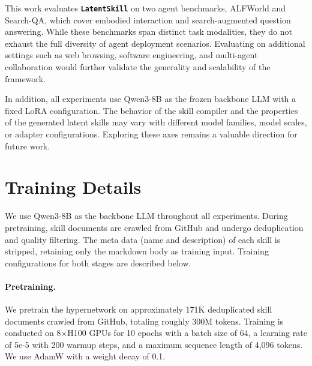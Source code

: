 \documentclass{llmxive}
\providecommand{\textttt}[1]{\texttt{#1}}
\providecommand{\method}{\textbf{\textttt{LatentSkill}}}
\begin{document}

This work evaluates \method{} on two agent benchmarks, ALFWorld and Search-QA, which cover embodied interaction and search-augmented question answering. While these benchmarks span distinct task modalities, they do not exhaust the full diversity of agent deployment scenarios. Evaluating on additional settings such as web browsing, software engineering, and multi-agent collaboration would further validate the generality and scalability of the framework.

In addition, all experiments use Qwen3-8B as the frozen backbone LLM with a fixed LoRA configuration. The behavior of the skill compiler and the properties of the generated latent skills may vary with different model families, model scales, or adapter configurations. Exploring these axes remains a valuable direction for future work.





\appendix
\section{Training Details}
\label{app:training}

We use Qwen3-8B \citep{Yang2025Qwen3} as the backbone LLM throughout all experiments. During pretraining, skill documents are crawled from GitHub and undergo deduplication and quality filtering. The meta data (name and description) of each skill is stripped, retaining only the markdown body as training input. Training configurations for both stages are described below.


\paragraph{Pretraining.} We pretrain the hypernetwork on approximately 171K deduplicated skill documents crawled from GitHub, totaling roughly 300M tokens. Training is conducted on 8$\times$H100 GPUs for 10 epochs with a batch size of 64, a learning rate of 5e-5 with 200 warmup steps, and a maximum sequence length of 4,096 tokens. We use AdamW with a weight decay of 0.1.
\end{document}
